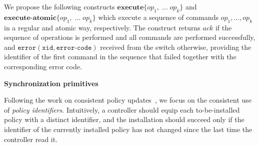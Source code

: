 \documentclass[conference]{sigcomm-alternate}
\newcommand{\hide}[1]{}
\newcommand{\petr}[1]{\textit{\textcolor{blue}{[petr]: #1}}} %
\newcommand{\error}{\texttt{error}}
\newcommand{\xid}{\texttt{xid}}
\newcommand{\ecode}{\texttt{error-code}}
\newcommand{\exec}{\textbf{execute}}
\newcommand{\execatomic}{\textbf{execute-atomic}}
\newcommand{\ack}{\textit{ack}}
\begin{document}
We propose the following constructs
$\exec\{op_1,\;\ldots\;op_k\}$ and $\execatomic\{op_1,\;\ldots\;op_k\}$
which execute a sequence of commands $op_1,\ldots,op_k$ in
a regular and atomic way, respectively.
The construct returns $\ack$ if the sequence of operations is performed and all commands are performed successfully, and
$\error(\xid,\ecode)$ received from the switch otherwise, providing
the identifier of the first command in the sequence that failed
together with the corresponding error code.



\hide{
Given this motivation, we now present a more powerful transactional interface.
At a high level, we aim to export a
transactional interface which allows each controller $i\in[N]$ ($N\geq
2$) to perform multiple
operations on the configuration of an OpenFlow switch as an atomic
\emph{transaction}, inspired by the transactional-memory paradigm~\cite{stm-st95,tm-book}. A transaction may \emph{commit}, in
which case it appears as executed sequentially, or \emph{abort}, in
which none of its operations takes effect.
}

\noindent\textbf{Synchronization primitives}
%
\hide{

Our approach is based on the distributed management of \emph{identifiers (IDs)} \petr{unclear what "identifiers" mean here}. In particular,
we introduce two new synchronization objects (and describe their implementation in standard OpenFlow),
which allow controllers to coordinate
themselves based on these identifiers.

As we will see, in the OpenFlow implementation of our mechanism,
in addition to the ``normal'' configuration stored at the switch
(e.g., forwarding rules according to network policies),
controllers will maintain additional information
in the switch configuration: this information is used by the
controllers to synchronize.
\petr{"As we will see,..." - looks funny compared with "As we will see ..." at the end of Sec 2}
\subsection{Synchronization Objects}\label{sec:t-if}
}

Following the work on consistent policy
updates~\cite{network-update,stn}, we focus on the consistent use of  \emph{policy
identifiers}.
Intuitively, a controller should
equip each to-be-installed policy with a distinct
identifier,
and the installation should succeed only if the identifier of the
currently installed policy has not changed since the last time the
controller read it.
\end{document}
